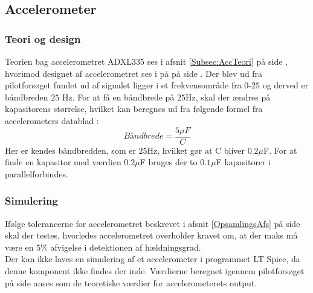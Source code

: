 \subsection{Accelerometer}
\subsubsection{Teori og design}
Teorien bag accelerometret ADXL335 ses i afsnit \ref{Subsec:AccTeori} på side \pageref{Subsec:AccTeori}, hvorimod designet af accelerometret ses i på  på side \pageref{pforsoeg1}. Der blev ud fra pilotforsøget fundet ud af signalet ligger i et frekvensområde fra $0$-$25$ og derved er båndbreden $25$ Hz. For at få en båndbrede på $25$Hz, skal der ændres på kapasitorens størrelse, hvilket kan beregnes ud fra følgende formel fra accelerometers datablad \cite{Device2009}:
\begin{equation}
Båndbrede = \dfrac{5\mu F}{C}
\end{equation}
Her er kendes båndbredden, som er $25$Hz, hvilket gør at C bliver $0.2\mu$F. For at finde en kapasitor med værdien $0.2\mu$F bruges der to $0.1\mu$F kapasitorer i parallelforbindes.  

\subsubsection{Simulering}
Ifølge tolerancerne for accelerometret beskrevet i afsnit \ref{OpsamlingsAfs} på side \pageref{OpsamlingsAfs} skal der testes, hvorledes accelerometret overholder kravet om, at der maks må være en $5\%$ afvigelse i detektionen af hældningsgrad. \\
Der kan ikke laves en simulering af et accelerometer i programmet LT Spice, da denne komponent ikke findes der inde. Værdierne beregnet igennem pilotforsøget på side \pageref{Sec:Pilotforsoeg} anses som de teoretiske værdier for accelerometerets output.

